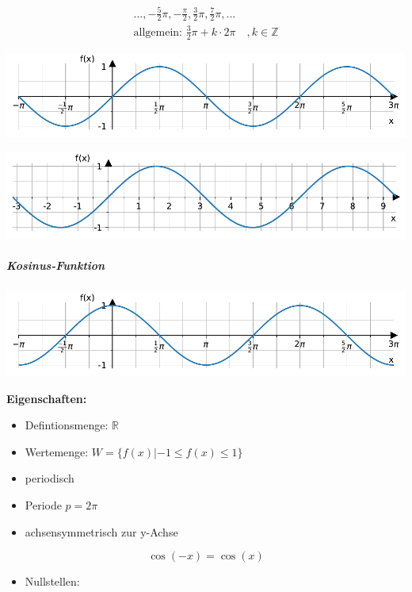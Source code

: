 \documentclass[
  11pt,
  a4paper,
  DIV=11,
  numbers=noendperiod]{scrartcl}
\let\oldsubparagraph\subparagraph
\renewcommand{\subparagraph}[1]{\oldsubparagraph{#1}\mbox{}}
\providecommand{\tightlist}{%
  \setlength{\itemsep}{0pt}\setlength{\parskip}{0pt}}\usepackage{longtable,booktabs,array}
\begin{document}
\[
\begin{aligned}
..., -\frac{5}{2}\pi, -\frac{\pi}{2}, \frac{3}{2}\pi, \frac{7}{2}\pi, ...\\
\text{allgemein: }\frac{3}{2}\pi + k\cdot 2\pi \quad ,k\in \mathbb{Z}
\end{aligned}
\]

\includegraphics{7_Trigonometrische_Funktionen_files/figure-pdf/cell-5-output-1.pdf}

\includegraphics{7_Trigonometrische_Funktionen_files/figure-pdf/cell-6-output-1.pdf}

\subparagraph{Kosinus-Funktion}\label{kosinus-funktion}

\includegraphics{7_Trigonometrische_Funktionen_files/figure-pdf/cell-7-output-1.pdf}

\textbf{Eigenschaften:}

\begin{itemize}
\tightlist
\item
  Defintionsmenge: \(\mathbb{R}\)
\item
  Wertemenge: \(W=\{f(x)|-1\leq f(x)\leq 1\}\)
\item
  periodisch
\item
  Periode \(p=2\pi\)
\item
  achsensymmetrisch zur y-Achse
\end{itemize}

\[
\cos(-x)=\cos(x)
\]

\begin{itemize}
\tightlist
\item
  Nullstellen:
\end{itemize}
\end{document}
